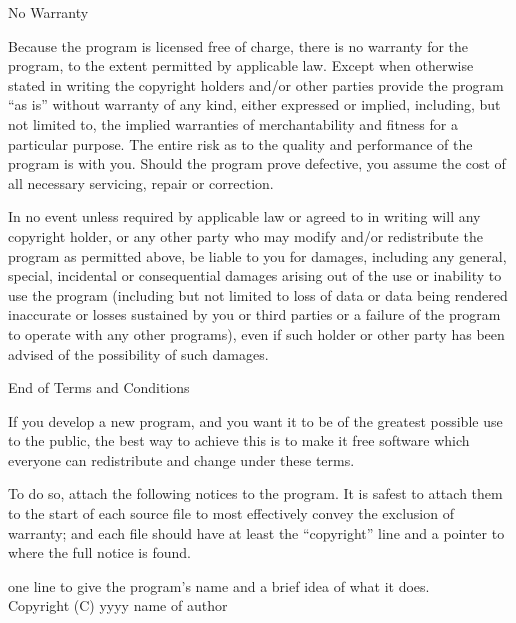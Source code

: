 \begin{lrbox}{\gpl}
\begin{minipage}{3\textwidth}
\begincentered
	{\Large\sc No Warranty}
\endcentered

\item
{\sc Because the program is licensed free of charge, there is no warranty
for the program, to the extent permitted by applicable law.  Except when
otherwise stated in writing the copyright holders and/or other parties
provide the program ``as is'' without warranty of any kind, either expressed
or implied, including, but not limited to, the implied warranties of
merchantability and fitness for a particular purpose.  The entire risk as
to the quality and performance of the program is with you.  Should the
program prove defective, you assume the cost of all necessary servicing,
repair or correction.}

\item
{\sc In no event unless required by applicable law or agreed to in writing
will any copyright holder, or any other party who may modify and/or
redistribute the program as permitted above, be liable to you for damages,
including any general, special, incidental or consequential damages arising
out of the use or inability to use the program (including but not limited
to loss of data or data being rendered inaccurate or losses sustained by
you or third parties or a failure of the program to operate with any other
programs), even if such holder or other party has been advised of the
possibility of such damages.}

\endenumeration


\begincentered
	{\Large\sc End of Terms and Conditions}
\endcentered


\pagebreak[2]


If you develop a new program, and you want it to be of the greatest
possible use to the public, the best way to achieve this is to make it
free software which everyone can redistribute and change under these
terms.

  To do so, attach the following notices to the program.  It is safest to
  attach them to the start of each source file to most effectively convey
  the exclusion of warranty; and each file should have at least the
  ``copyright'' line and a pointer to where the full notice is found.

\beginnarrower
	one line to give the program's name and a brief idea of what it does. \\
	Copyright (C) yyyy  name of author \\


\end{minipage}
\end{lrbox}
